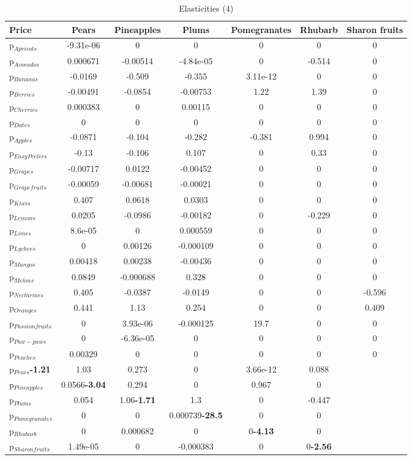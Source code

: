 \documentclass[11pt]{article}
\begin{document}
\begin{table}[h]
\caption{Elasticities (4)}
\label{table:elasticities 4}
\begin{center}
\begin{tabular}{lcccccc} \hline \hline
Price &Pears &Pineapples &Plums &Pomegranates &Rhubarb &Sharon fruits \\ \hline
p$_{Apricots}$ &-9.31e-06 &0 &0 &0 &0 &0 \\
p$_{Avocados}$ &0.000671 &-0.00514 &-4.84e-05 &0 &-0.514 &0 \\
p$_{Bananas}$ &-0.0169 &-0.509 &-0.355 &3.11e-12 &0 &0 \\
p$_{Berries}$ &-0.00491 &-0.0854 &-0.00753 &1.22 &1.39 &0 \\
p$_{Cherries}$ &0.000383 &0 &0.00115 &0 &0 &0 \\
p$_{Dates}$ &0 &0 &0 &0 &0 &0 \\
p$_{Apples}$ &-0.0871 &-0.104 &-0.282 &-0.381 &0.994 &0 \\
p$_{Easy Peelers}$ &-0.13 &-0.106 &0.107 &0 &0.33 &0 \\
p$_{Grapes}$ &-0.00717 &0.0122 &-0.00452 &0 &0 &0 \\
p$_{Grapefruits}$ &-0.00059 &-0.00681 &-0.00021 &0 &0 &0 \\
p$_{Kiwis}$ &0.407 &0.0618 &0.0303 &0 &0 &0 \\
p$_{Lemons}$ &0.0205 &-0.0986 &-0.00182 &0 &-0.229 &0 \\
p$_{Limes}$ &8.6e-05 &0 &0.000559 &0 &0 &0 \\
p$_{Lychees}$ &0 &0.00126 &-0.000109 &0 &0 &0 \\
p$_{Mangos}$ &0.00418 &0.00238 &-0.00436 &0 &0 &0 \\
p$_{Melons}$ &0.0849 &-0.000688 &0.328 &0 &0 &0 \\
p$_{Nectarines}$ &0.405 &-0.0387 &-0.0149 &0 &0 &-0.596 \\
p$_{Oranges}$ &0.441 &1.13 &0.254 &0 &0 &0.409 \\
p$_{Passion fruits}$ &0 &3.93e-06 &-0.000125 &19.7 &0 &0 \\
p$_{Paw-paws}$ &0 &-6.36e-05 &0 &0 &0 &0 \\
p$_{Peaches}$ &0.00329 &0 &0 &0 &0 &0 \\
p$_{Pears}$\textbf{-1.21} &1.03 &0.273 &0 &3.66e-12 &0.088 \\
p$_{Pineapples}$ &0.0566\textbf{-3.04} &0.294 &0 &0.967 &0 \\
p$_{Plums}$ &0.054 &1.06\textbf{-1.71} &1.3 &0 &-0.447 \\
p$_{Pomegranates}$ &0 &0 &0.000739\textbf{-28.5} &0 &0 \\
p$_{Rhubarb}$ &0 &0.000682 &0 &0\textbf{-4.13} &0 \\
p$_{Sharon fruits}$ &1.49e-05 &0 &-0.000383 &0 &0\textbf{-2.56} \\
\end{tabular}
\end{center}
\end{table}
\end{document}

